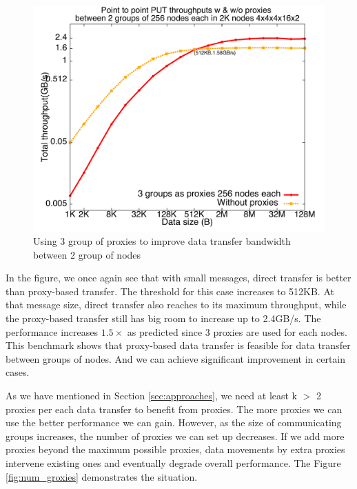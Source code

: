 \documentclass[final,5p,times]{elsarticle}
\begin{document}
\begin{figure}[!htb]
\vspace{-0.1in}
\centering
\includegraphics[scale=0.3]{figures/3groxies}
\vspace{-0.2in}
\caption{Using 3 group of proxies to improve data transfer bandwidth between 2 group of nodes}
\vspace{-0.1in}
\label{fig:3groxies}
\end{figure}

In the figure, we once again see that with small messages, direct transfer is better than proxy-based transfer. The threshold for this case increases to 512KB. At that message size, direct transfer also reaches to its maximum throughput, while the proxy-based transfer still has big room to increase up to 2.4GB/s. The performance increases $1.5\times$ as predicted since 3 proxies are used for each nodes. This benchmark shows that proxy-based data transfer is feasible for data transfer between groups of nodes. And we can achieve significant improvement in certain cases.

As we have mentioned in Section \ref{sec:approaches}, we need at least k $>$ 2 proxies per each data transfer to benefit from proxies. The more proxies we can use the better performance we can gain. However, as the size of communicating groups increases, the number of proxies we can set up decreases. If we add more proxies beyond the maximum possible proxies, data movements by extra proxies intervene existing ones and eventually degrade overall performance. The Figure \ref{fig:num_groxies} demonstrates the situation.
\end{document}
